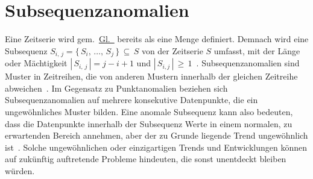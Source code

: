 \section{Subsequenzanomalien}

Eine Zeitserie wird gem.~\hyperref[eq:timeseries_set]{Gl.~} bereits als eine Menge definiert. Demnach wird eine
Subsequenz $S_{i,\,j} = \{\,S_i,\,\dots,\,S_j\,\}\,\subseteq\,S$ von der Zeitserie $S$ umfasst, mit der Länge oder Mächtigkeit
$|\,S_{i,\,j}\,|=j-i+1$ und $|\,S_{i,j}\,|\,\ge\,1$~\cite{Schmidl2022}. Subsequenzanomalien sind Muster in Zeitreihen, die von anderen
Mustern innerhalb der gleichen Zeitreihe abweichen~\cite{Chandola2009}\Cite[S.~12]{Wenig2024}. Im Gegensatz zu Punktanomalien beziehen
sich Subsequenz\-ano\-malien auf mehrere konsekutive Datenpunkte, die ein ungewöhnliches Muster bilden. Eine anomale Subsequenz kann also
bedeuten, dass die Datenpunkte innerhalb der Subsequenz Werte in einem normalen, zu erwartenden Bereich annehmen, aber der zu Grunde
liegende Trend ungewöhnlich ist~\cite{Chandola2009}\cite[S.~17]{Boniol2021}. Solche ungewöhnlichen oder einzigartigen Trends und
Entwicklungen können auf zukünftig auftretende Probleme hindeuten, die sonst unentdeckt bleiben würden.